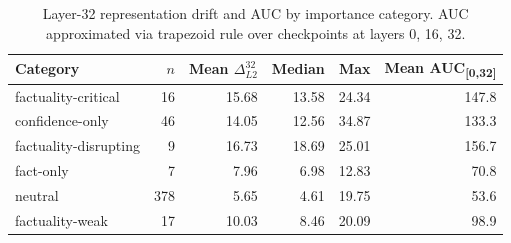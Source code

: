 \begin{table}[h]
\centering\small
\begin{tabular}{lrrrrr}
\toprule
Category & $n$ & Mean $\Delta_{L2}^{32}$ & Median & Max & Mean AUC\textsubscript{[0,32]} \\
\midrule
  factuality-critical & 16 & 15.68 & 13.58 & 24.34 & 147.8 \\
  confidence-only & 46 & 14.05 & 12.56 & 34.87 & 133.3 \\
  factuality-disrupting & 9 & 16.73 & 18.69 & 25.01 & 156.7 \\
  fact-only & 7 & 7.96 & 6.98 & 12.83 & 70.8 \\
  neutral & 378 & 5.65 & 4.61 & 19.75 & 53.6 \\
  factuality-weak & 17 & 10.03 & 8.46 & 20.09 & 98.9 \\
\bottomrule
\end{tabular}
\caption{Layer-32 representation drift and AUC by importance category. AUC approximated via trapezoid rule over checkpoints at layers 0, 16, 32.}
\label{tab:e4_layer_drift_stats}
\end{table}
